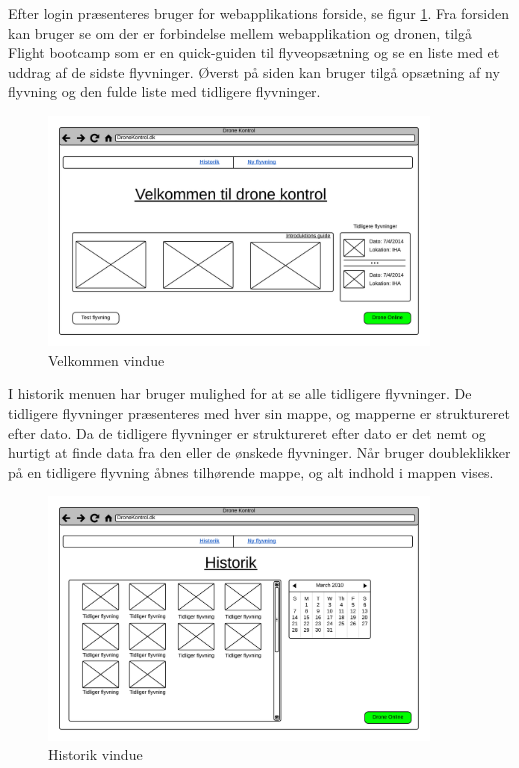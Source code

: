 Efter login præsenteres bruger for webapplikations forside, se figur \ref{fig:mockup_welcome}. 
Fra forsiden kan bruger se om der er forbindelse mellem webapplikation og dronen, tilgå Flight bootcamp som er en quick-guiden til flyveopsætning og se en liste med et uddrag af de sidste flyvninger. Øverst på siden kan bruger tilgå opsætning af ny flyvning og den fulde liste med tidligere flyvninger.

\vspace{-5pt}
 \begin{figure}[H]
 	\centering
 	\includegraphics[width=0.9\textwidth]{Billeder/UI_mockups/index.png}
 	\vspace{-5pt}
 	\caption{Velkommen vindue}
 	\label{fig:mockup_welcome}
 \end{figure} 

\vspace{1cm}

I historik menuen har bruger mulighed for at se alle tidligere flyvninger. De tidligere flyvninger præsenteres med hver sin mappe, og mapperne er struktureret efter dato. Da de tidligere flyvninger er struktureret efter dato er det nemt og hurtigt at finde data fra den eller de ønskede flyvninger. Når bruger doubleklikker på en tidligere flyvning åbnes tilhørende mappe, og alt indhold i mappen vises.

\vspace{-5pt}
\begin{figure}[H]
	\centering
	\includegraphics[width=0.9\textwidth]{Billeder/UI_mockups/archive.png}
	\vspace{-5pt}
	\caption{Historik vindue}
	\label{fig:mockup_archive}
\end{figure}

